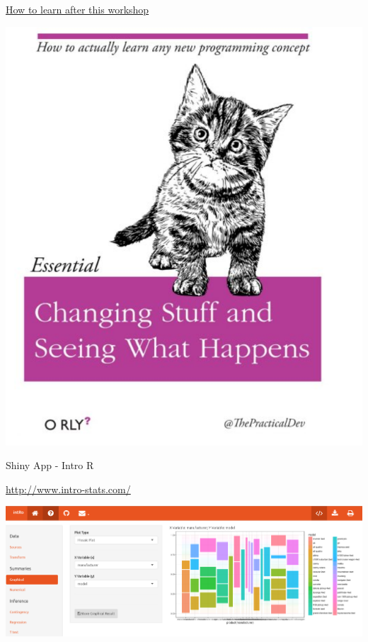 \documentclass[
  10pt,
  ignorenonframetext,
]{beamer}
\begin{document}
\begin{frame}{\href{https://lgatto.github.io/2017_11_09_Rcourse_Jena/before-we-start.html\#knowing-your-way-around-rstudio}{How
to learn after this workshop}}
\protect\hypertarget{how-to-learn-after-this-workshop}{}

\includegraphics{figure/changing_stuff.PNG}

\end{frame}

\begin{frame}{Shiny App - Intro R}
\protect\hypertarget{shiny-app---intro-r}{}

\url{http://www.intro-stats.com/}

\includegraphics{figure/intror_shiny.PNG}

\end{frame}
\end{document}
